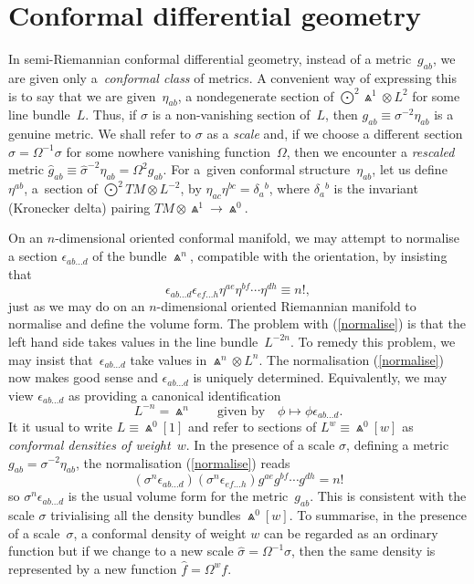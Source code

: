\documentclass[10pt,a4paper]{amsart}
\numberwithin{equation}{section}
\begin{document}
\section{Conformal differential geometry}\label{conf}
In semi-Riemannian conformal differential geometry, instead of a
metric~$g_{ab}$, we are given only a~{\em conformal class} of metrics. A
convenient way of expressing this is to say that we are given~$\eta_{ab}$, a
nondegenerate section of $\bigodot^2\!\Wedge^1\otimes L^2$ for some line
bundle~$L$. Thus, if $\sigma$ is a non-vanishing section of~$L$, then
$g_{ab}\equiv\sigma^{-2}\eta_{ab}$ is a genuine metric. We shall refer to
$\sigma$ as a {\em scale} and, if we choose a different section
$\widehat\sigma=\Omega^{-1}\sigma$ for some nowhere vanishing
function~$\Omega$, then we encounter a {\em rescaled} metric
$\widehat{g}_{ab}\equiv\widehat\sigma^{-2}\eta_{ab}=\Omega^2g_{ab}$. For a~given conformal structure~$\eta_{ab}$, let us define~$\eta^{ab}$, a~section of
$\bigodot^2\!TM\otimes L^{-2}$, by $\eta_{ac}\eta^{bc}=\delta_a{}^b$, where
$\delta_a{}^b$ is the invariant (Kronecker delta) pairing
$TM\otimes\Wedge^1\to\Wedge^0$.

On an $n$-dimensional oriented conformal manifold, we may attempt to normalise
a section $\epsilon_{ab\dots d}$ of the bundle $\Wedge^n$, compatible
with the orientation, by insisting that
\begin{equation}\label{normalise}
\epsilon_{ab\dots d}\epsilon_{ef\dots h}\eta^{ae}\eta^{bf}\cdots\eta^{dh}
\equiv n! ,\end{equation}
just as we may do on an $n$-dimensional oriented Riemannian manifold to
normalise and define the volume form. The problem with (\ref{normalise}) is
that the left hand side takes values in the line bundle~$L^{-2n}$. To remedy
this problem, we may insist that~$\epsilon_{ab\dots d}$ take values in
$\Wedge^n\otimes L^n$. The normalisation (\ref{normalise}) now makes good
sense and $\epsilon_{ab\dots d}$ is uniquely determined. Equivalently, we may
view $\epsilon_{ab\dots d}$ as providing a canonical identification
\[L^{-n}=\Wedge^n\qquad
\mbox{given by}\quad\phi\mapsto\phi\epsilon_{ab\dots d}.\]
It it usual to write $L\equiv\Wedge^0[1]$ and refer to sections of
$L^w\equiv\Wedge^0[w]$ as {\em conformal densities of weight}~$w$. In the
presence of a scale $\sigma$, defining a metric $g_{ab}=\sigma^{-2}\eta_{ab}$,
the normalisation (\ref{normalise}) reads
\[(\sigma^n\epsilon_{ab\dots d})(\sigma^n\epsilon_{ef\dots h})
g^{ae}g^{bf}\cdots g^{dh}=n!\]
so $\sigma^n\epsilon_{ab\dots d}$ is the usual volume form for the
metric~$g_{ab}$. This is consistent with the scale $\sigma$ trivialising
all the density bundles $\Wedge^0[w]$. To summarise, in the presence of a
scale~$\sigma$, a conformal density of weight $w$ can be regarded as an ordinary
function but if we change to a new scale $\widehat\sigma=\Omega^{-1}\sigma$,
then the same density is represented by a new function $\widehat{f}=\Omega^wf$.
\end{document}
